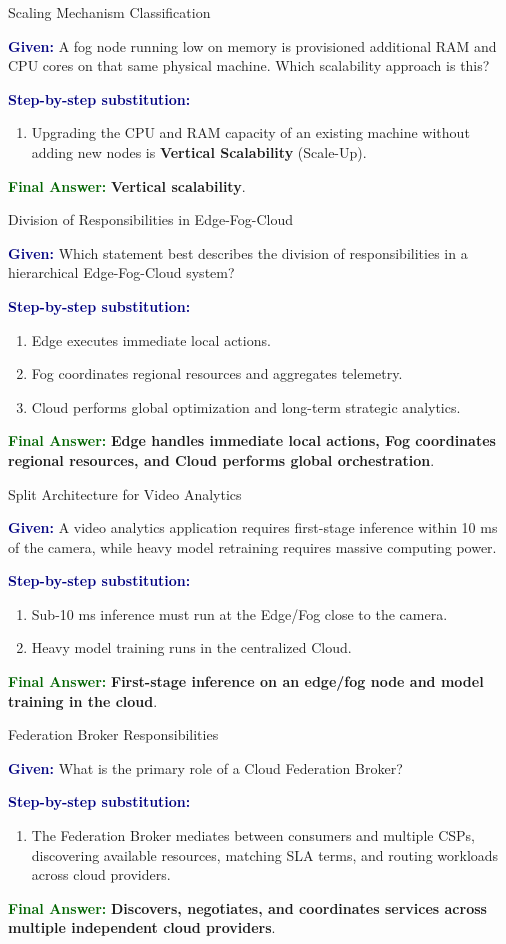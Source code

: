 \documentclass[11pt,a4paper,openany]{report}
\newcommand{\Given}{\par\textbf{\textcolor{navy}{Given:}} }
\newcommand{\Steps}{\par\textbf{\textcolor{navy}{Step-by-step substitution:}}\par}
\newcommand{\Answer}{\par\textbf{\textcolor{darkgreen}{Final Answer:}} }
\begin{document}
\begin{solved}{Scaling Mechanism Classification}
\Given A fog node running low on memory is provisioned additional RAM and CPU cores on that same physical machine. Which scalability approach is this?
\Steps
\begin{enumerate}[leftmargin=*]
  \item Upgrading the CPU and RAM capacity of an existing machine without adding new nodes is \textbf{Vertical Scalability} (Scale-Up).
\end{enumerate}
\Answer \textbf{Vertical scalability}.
\end{solved}

\begin{solved}{Division of Responsibilities in Edge-Fog-Cloud}
\Given Which statement best describes the division of responsibilities in a hierarchical Edge-Fog-Cloud system?
\Steps
\begin{enumerate}[leftmargin=*]
  \item Edge executes immediate local actions.
  \item Fog coordinates regional resources and aggregates telemetry.
  \item Cloud performs global optimization and long-term strategic analytics.
\end{enumerate}
\Answer \textbf{Edge handles immediate local actions, Fog coordinates regional resources, and Cloud performs global orchestration}.
\end{solved}

\begin{solved}{Split Architecture for Video Analytics}
\Given A video analytics application requires first-stage inference within 10 ms of the camera, while heavy model retraining requires massive computing power.
\Steps
\begin{enumerate}[leftmargin=*]
  \item Sub-10 ms inference must run at the Edge/Fog close to the camera.
  \item Heavy model training runs in the centralized Cloud.
\end{enumerate}
\Answer \textbf{First-stage inference on an edge/fog node and model training in the cloud}.
\end{solved}

\begin{solved}{Federation Broker Responsibilities}
\Given What is the primary role of a Cloud Federation Broker?
\Steps
\begin{enumerate}[leftmargin=*]
  \item The Federation Broker mediates between consumers and multiple CSPs, discovering available resources, matching SLA terms, and routing workloads across cloud providers.
\end{enumerate}
\Answer \textbf{Discovers, negotiates, and coordinates services across multiple independent cloud providers}.
\end{solved}
\end{document}
